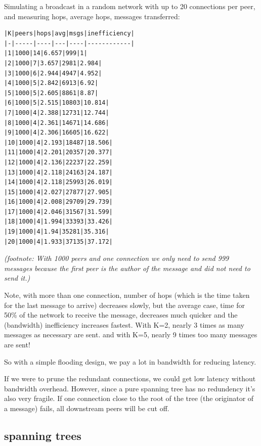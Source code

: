 \documentclass[sigconf]{acmart}
\begin{document}
Simulating a broadcast in a random network with up to 20 connections
per peer, and measuring hops, average hops, messages transferred:

\begin{verbatim}
|K|peers|hops|avg|msgs|inefficiency|
|-|-----|----|---|----|------------|
|1|1000|14|6.657|999|1|
|2|1000|7|3.657|2981|2.984|
|3|1000|6|2.944|4947|4.952|
|4|1000|5|2.842|6913|6.92|
|5|1000|5|2.605|8861|8.87|
|6|1000|5|2.515|10803|10.814|
|7|1000|4|2.388|12731|12.744|
|8|1000|4|2.361|14671|14.686|
|9|1000|4|2.306|16605|16.622|
|10|1000|4|2.193|18487|18.506|
|11|1000|4|2.201|20357|20.377|
|12|1000|4|2.136|22237|22.259|
|13|1000|4|2.118|24163|24.187|
|14|1000|4|2.118|25993|26.019|
|15|1000|4|2.027|27877|27.905|
|16|1000|4|2.008|29709|29.739|
|17|1000|4|2.046|31567|31.599|
|18|1000|4|1.994|33393|33.426|
|19|1000|4|1.94|35281|35.316|
|20|1000|4|1.933|37135|37.172|
\end{verbatim}

{\em (footnote: With 1000 peers and one connection we only need to send
999 messages because the first peer is the author of the message
and did not need to send it.)}

Note, with more than one connection, number of hops (which is the time
taken for the last message to arrive) decreases slowly, but the
average case, time for 50\% of the network to receive the message,
decreases much quicker and the (bandwidth) inefficiency increases
fastest.  With K=2, nearly 3 times as many messages as necessary are
sent.  and with K=5, nearly 9 times too many messages are sent!

So with a simple flooding design, we pay a lot in bandwidth for
reducing latency.

If we were to prune the redundant connections, we could get low
latency without bandwidth overhead. However, since a pure spanning
tree has no redundency it's also very fragile. If one connection close
to the root of the tree (the originator of a message) fails, all
downstream peers will be cut off.

\subsection{spanning trees}
\end{document}
